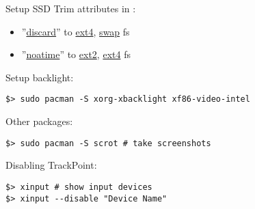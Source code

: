 \documentclass[a4paper, 12pt]{article}
\begin{document}
Setup SSD Trim attributes in :
\begin{itemize}
\item ''\url{discard}'' to \url{ext4}, \url{swap} fs
\item ''\url{noatime}'' to \url{ext2}, \url{ext4} fs
\end{itemize}

Setup backlight:
\begin{lstlisting}
$> sudo pacman -S xorg-xbacklight xf86-video-intel
\end{lstlisting}

Other packages:
\begin{lstlisting}
$> sudo pacman -S scrot # take screenshots
\end{lstlisting}

Disabling TrackPoint:
\begin{lstlisting}
$> xinput # show input devices
$> xinput --disable "Device Name"
\end{lstlisting}
\end{document}
